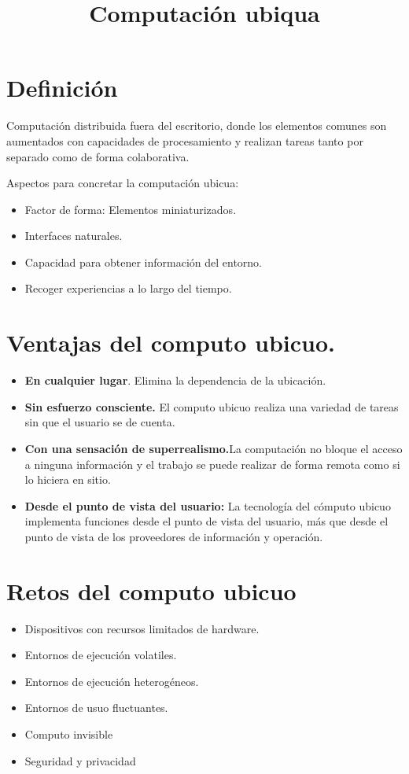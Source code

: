 \documentclass[
  letterpaper,
  DIV=11,
  numbers=noendperiod]{scrartcl}
\title{Computación ubiqua}
\author{}
\date{}
\providecommand{\tightlist}{%
  \setlength{\itemsep}{0pt}\setlength{\parskip}{0pt}}
\begin{document}
\maketitle


\section{Definición}\label{definiciuxf3n}

Computación distribuida fuera del escritorio, donde los elementos
comunes son aumentados con capacidades de procesamiento y realizan
tareas tanto por separado como de forma colaborativa.

Aspectos para concretar la computación ubicua:

\begin{itemize}
\tightlist
\item
  Factor de forma: Elementos miniaturizados.
\item
  Interfaces naturales.
\item
  Capacidad para obtener información del entorno.
\item
  Recoger experiencias a lo largo del tiempo.
\end{itemize}

\section{Ventajas del computo
ubicuo.}\label{ventajas-del-computo-ubicuo.}

\begin{itemize}
\item
  \textbf{En cualquier lugar}. Elimina la dependencia de la ubicación.
\item
  \textbf{Sin esfuerzo consciente.} El computo ubicuo realiza una
  variedad de tareas sin que el usuario se de cuenta.
\item
  \textbf{Con una sensación de superrealismo.}La computación no bloque
  el acceso a ninguna información y el trabajo se puede realizar de
  forma remota como si lo hiciera en sitio.
\item
  \textbf{Desde el punto de vista del usuario:} La tecnología del
  cómputo ubicuo implementa funciones desde el punto de vista del
  usuario, más que desde el punto de vista de los proveedores de
  información y operación.
\end{itemize}

\section{Retos del computo ubicuo}\label{retos-del-computo-ubicuo}

\begin{itemize}
\item
  Dispositivos con recursos limitados de hardware.
\item
  Entornos de ejecución volatiles.
\item
  Entornos de ejecución heterogéneos.
\item
  Entornos de usuo fluctuantes.
\item
  Computo invisible
\item
  Seguridad y privacidad
\end{itemize}
\end{document}
